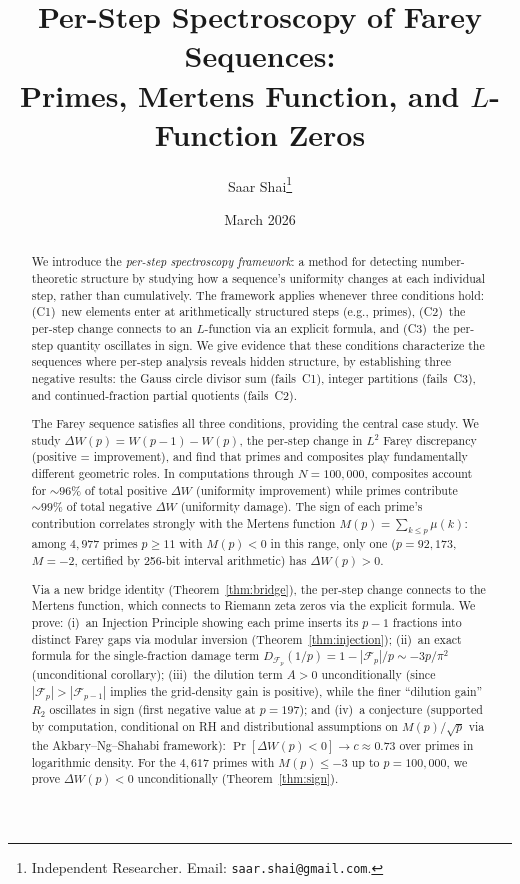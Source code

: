 \documentclass[11pt]{article}
\title{Per-Step Spectroscopy of Farey Sequences:\\
Primes, Mertens Function, and $L$-Function Zeros}
\author{
  Saar Shai\thanks{Independent Researcher. Email: \texttt{saar.shai@gmail.com}.}
}
\date{March 2026}
\theoremstyle{definition}
\begin{document}
\maketitle

\begin{abstract}
We introduce the \emph{per-step spectroscopy framework}: a method for detecting
number-theoretic structure by studying how a sequence's uniformity changes at
each individual step, rather than cumulatively.  The framework applies whenever
three conditions hold: (C1)~new elements enter at arithmetically structured steps
(e.g., primes), (C2)~the per-step change connects to an $L$-function via an
explicit formula, and (C3)~the per-step quantity oscillates in sign.
We give evidence that these conditions characterize the sequences where per-step
analysis reveals hidden structure, by establishing three negative results: the
Gauss circle divisor sum (fails~C1), integer partitions (fails~C3), and
continued-fraction partial quotients (fails~C2).

The Farey sequence satisfies all three conditions, providing the central case study.
We study $\Delta W(p) = W(p-1) - W(p)$, the per-step change in
$L^2$ Farey discrepancy (positive = improvement), and find that primes and composites play
fundamentally different geometric roles.
In computations through $N = 100{,}000$, composites account for ${\sim}96\%$
of total positive $\Delta W$ (uniformity improvement) while primes contribute
${\sim}99\%$ of total negative $\Delta W$ (uniformity damage).
The sign of each prime's contribution correlates strongly with the Mertens
function $M(p) = \sum_{k \le p} \mu(k)$: among $4{,}977$ primes $p \ge 11$
with $M(p) < 0$ in this range, only one ($p = 92{,}173$, $M = -2$,
certified by 256-bit interval arithmetic) has $\Delta W(p) > 0$.

Via a new bridge identity (Theorem~\ref{thm:bridge}), the per-step change
connects to the Mertens function, which connects to Riemann zeta zeros via the
explicit formula.  We prove: (i)~an Injection Principle showing each prime
inserts its $p-1$ fractions into distinct Farey gaps via modular inversion
(Theorem~\ref{thm:injection}); (ii)~an exact formula for the single-fraction
damage term $D_{\mathcal{F}_p}(1/p) = 1 - |\mathcal{F}_p|/p \sim -3p/\pi^2$
(unconditional corollary); (iii)~the dilution term $A > 0$
unconditionally (since $|\mathcal{F}_p| > |\mathcal{F}_{p-1}|$ implies
the grid-density gain is positive), while the finer ``dilution gain''
$R_2$ oscillates in sign (first negative value at $p = 197$); and
(iv)~a conjecture (supported by computation, conditional on RH and distributional
assumptions on $M(p)/\sqrt{p}$ via the Akbary--Ng--Shahabi framework):
$\Pr[\Delta W(p) < 0] \to c \approx 0.73$ over primes in logarithmic density.
For the $4{,}617$ primes with $M(p) \le -3$ up to $p = 100{,}000$,
we prove $\Delta W(p) < 0$ unconditionally (Theorem~\ref{thm:sign}).


\end{abstract}
\end{document}
